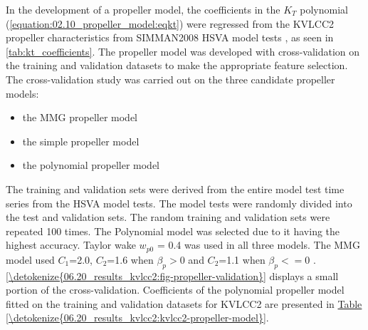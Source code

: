 In the development of a propeller model, the coefficients in the \(K_T\) polynomial (\autoref{equation:02.10_propeller_model:eqkt}) were regressed from the KVLCC2 propeller characteristics from SIMMAN2008 HSVA model tests \cite{sternExperienceSIMMAN20082011}, as seen in \autoref{tab:kt_coefficients}. The propeller model was developed with cross-validation on the training and validation datasets to make the appropriate feature selection.
The cross-validation study was carried out on the three candidate propeller models: 
\vspace{5pt}
\begin{itemize}
    \setlength\itemsep{5pt}
    \item the MMG propeller model
    \item the simple propeller model
    \item the polynomial propeller model
\end{itemize}
\vspace{5pt}
The training and validation sets were derived from the entire model test time series from the HSVA model tests. The model tests were randomly divided into the test and validation sets. The random training and validation sets were repeated 100 times. The Polynomial model was selected due to it having the highest accuracy. Taylor wake \(w_{p0}\) = {0.4} was used in all three models. The MMG model used \(C_1\)={2.0}, \(C_2\)={1.6} when \(\beta_p>0\) and \(C_2\)={1.1} when \(\beta_p<=0\) \cite{yasukawaIntroductionMMGStandard2015}. \hyperref[\detokenize{06.20_results_kvlcc2:fig-propeller-validation}]{\autoref{\detokenize{06.20_results_kvlcc2:fig-propeller-validation}}} displays a small portion of the cross-validation. Coefficients of the polynomial propeller model fitted on the training and validation datasets for KVLCC2 are presented in \hyperref[\detokenize{06.20_results_kvlcc2:kvlcc2-propeller-model}]{Table \ref{\detokenize{06.20_results_kvlcc2:kvlcc2-propeller-model}}}.

